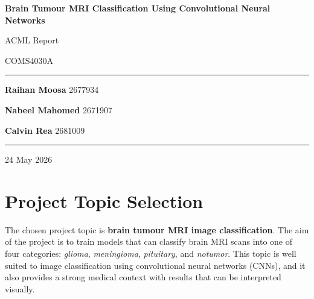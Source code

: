\documentclass{article}
\begin{document}
\begin{titlepage}
    \centering
    \vspace*{2.5cm}

    {\Huge\bfseries Brain Tumour MRI Classification Using Convolutional Neural Networks\par}

    \vspace{1.2cm}

    {\LARGE ACML Report\par}
    \vspace{0.3cm}
    {\Large COMS4030A\par}

    \vspace{2cm}

    \rule{0.75\textwidth}{0.6pt}
    \vspace{0.8cm}

    {\large
    \textbf{Raihan Moosa} \hspace{0.5cm} 2677934\par
    \vspace{0.3cm}
    \textbf{Nabeel Mahomed} \hspace{0.5cm} 2671907\par
    \vspace{0.3cm}
    \textbf{Calvin Rea} \hspace{1.05cm} 2681009\par
    }

    \vspace{0.8cm}
    \rule{0.75\textwidth}{0.6pt}

    \vfill

    {\large 24 May 2026\par}

\end{titlepage}

\section{Project Topic Selection}

The chosen project topic is \textbf{brain tumour MRI image classification}. The aim of the project is to train models that can classify brain MRI scans into one of four categories: \textit{glioma}, \textit{meningioma}, \textit{pituitary}, and \textit{notumor}. This topic is well suited to image classification using convolutional neural networks (CNNs), and it also provides a strong medical context with results that can be interpreted visually.
\end{document}

